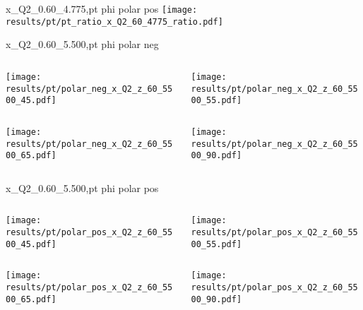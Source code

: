 \begin{frame}{x\_Q2\_0.60\_4.775,pt phi polar pos}
\texttt{[image: results/pt/pt\_ratio\_x\_Q2\_60\_4775\_ratio.pdf]}
\end{frame}
\begin{frame}{x\_Q2\_0.60\_5.500,pt phi polar neg}
\begin{columns}
\begin{column}[T]{0.5\textwidth}
\texttt{[image: results/pt/polar\_neg\_x\_Q2\_z\_60\_5500\_45.pdf]}
\end{column}
\begin{column}[T]{0.5\textwidth}
\texttt{[image: results/pt/polar\_neg\_x\_Q2\_z\_60\_5500\_55.pdf]}
\end{column}
\end{columns}
\begin{columns}
\begin{column}[T]{0.5\textwidth}
\texttt{[image: results/pt/polar\_neg\_x\_Q2\_z\_60\_5500\_65.pdf]}
\end{column}
\begin{column}[T]{0.5\textwidth}
\texttt{[image: results/pt/polar\_neg\_x\_Q2\_z\_60\_5500\_90.pdf]}
\end{column}
\end{columns}
\end{frame}
\begin{frame}{x\_Q2\_0.60\_5.500,pt phi polar pos}
\begin{columns}
\begin{column}[T]{0.5\textwidth}
\texttt{[image: results/pt/polar\_pos\_x\_Q2\_z\_60\_5500\_45.pdf]}
\end{column}
\begin{column}[T]{0.5\textwidth}
\texttt{[image: results/pt/polar\_pos\_x\_Q2\_z\_60\_5500\_55.pdf]}
\end{column}
\end{columns}
\begin{columns}
\begin{column}[T]{0.5\textwidth}
\texttt{[image: results/pt/polar\_pos\_x\_Q2\_z\_60\_5500\_65.pdf]}
\end{column}
\begin{column}[T]{0.5\textwidth}
\texttt{[image: results/pt/polar\_pos\_x\_Q2\_z\_60\_5500\_90.pdf]}
\end{column}
\end{columns}
\end{frame}
